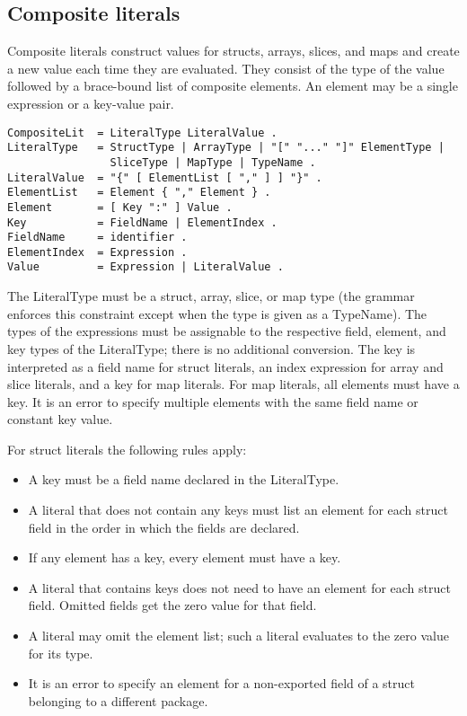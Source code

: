 {\subsection*{Composite literals}

Composite literals construct values for structs, arrays, slices, and
maps and create a new value each time they are evaluated. They consist
of the type of the value followed by a brace-bound list of composite
elements. An element may be a single expression or a key-value pair.

\begin{Verbatim}[frame=single]
CompositeLit  = LiteralType LiteralValue .
LiteralType   = StructType | ArrayType | "[" "..." "]" ElementType |
                SliceType | MapType | TypeName .
LiteralValue  = "{" [ ElementList [ "," ] ] "}" .
ElementList   = Element { "," Element } .
Element       = [ Key ":" ] Value .
Key           = FieldName | ElementIndex .
FieldName     = identifier .
ElementIndex  = Expression .
Value         = Expression | LiteralValue .
\end{Verbatim}

The LiteralType must be a struct, array, slice, or map type (the grammar
enforces this constraint except when the type is given as a TypeName).
The types of the expressions must be
assignable to the respective field, element,
and key types of the LiteralType; there is no additional conversion. The
key is interpreted as a field name for struct literals, an index
expression for array and slice literals, and a key for map literals. For
map literals, all elements must have a key. It is an error to specify
multiple elements with the same field name or constant key value.

For struct literals the following rules apply:

\begin{itemize}
\item
  A key must be a field name declared in the LiteralType.
\item
  A literal that does not contain any keys must list an element for each
  struct field in the order in which the fields are declared.
\item
  If any element has a key, every element must have a key.
\item
  A literal that contains keys does not need to have an element for each
  struct field. Omitted fields get the zero value for that field.
\item
  A literal may omit the element list; such a literal evaluates to the
  zero value for its type.
\item
  It is an error to specify an element for a non-exported field of a
  struct belonging to a different package.
\end{itemize}

}
